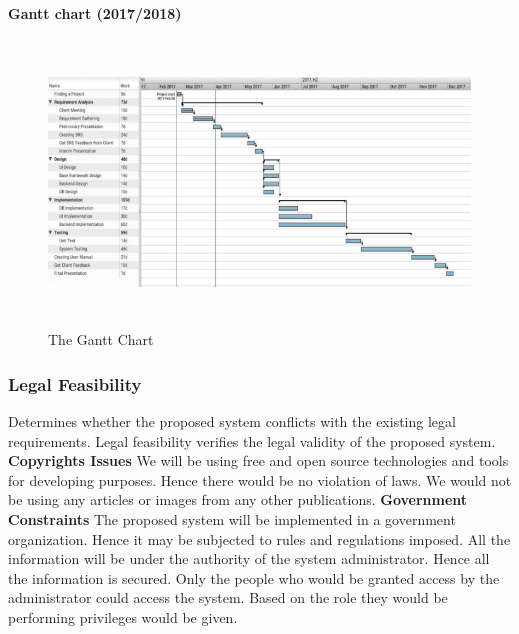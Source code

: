 \documentclass[a4paper,beamer]{article}
\begin{document}
	\noindent\textbf{Gantt chart (2017/2018)}
	\begin{figure}[h]
		\begin{center}
			\includegraphics[width=6in,height=3in]{img/grantt}
		\end{center}
		\caption{The Gantt Chart}
		\label{fig:gantt}
	\end{figure}

	\subsubsection{Legal Feasibility}
	Determines whether the proposed system conflicts with the existing legal requirements. Legal feasibility verifies the legal validity of the proposed system.\newline
	\newline
	\textbf{Copyrights Issues}\newline
	We will be using free and open source technologies and tools for developing purposes. Hence there would be no violation of laws. We would not be using any articles or images from any other publications.\newline
	\newline
	\textbf{Government Constraints}\newline
	The proposed system will be implemented in a government organization. Hence it may be subjected to rules and regulations imposed.\newline
	All the information will be under the authority of the system administrator. Hence all the information is secured. Only the people who would be granted access by the administrator could access the system. Based on the role they would be performing privileges would be given.\newline
	
	\newpage
	
\end{document}

